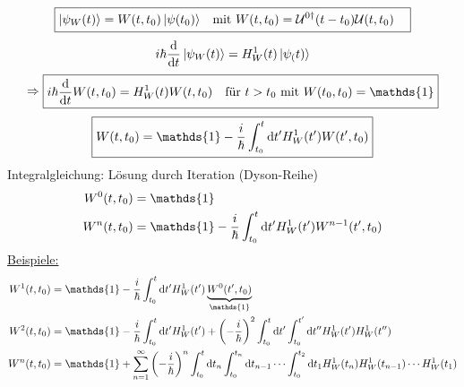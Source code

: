 		\begin{align*}
		\boxed{	
		\begin{aligned}
			\ket{\psi_W(t)} &= W(t,t_0) \ket{\psi(t_0)} &\text{mit~} W(t,t_0) &= \mathcal{U}^{0\dagger} (t-t_0) \mathcal{U} (t,t_0) 
		\end{aligned}
		}
		\end{align*}
		\begin{equation*}
			i \hbar \frac{\mathrm{d}}{\mathrm{d} t} \ket{\psi_W(t)} = H^1_W(t) \ket{\psi_(t)}
		\end{equation*}	
		\begin{align*}
		\Rightarrow
		\boxed{	
			\begin{aligned}
				i \hbar \frac{\diff}{\diff t} W(t,t_0) 
				&= H^1_W(t) W(t,t_0) &\text{für~} t>t_0 \text{~mit~} W(t_0,t_0) = \mathds{1}
			\end{aligned}
		}
		\end{align*}
		\begin{equation*}
			\boxed{ W(t,t_0) = \mathds{1} 
				- \frac{i}{\hbar} \int_{t_0}^{t} \diff t' H^1_W(t') W(t',t_0)
				}
		\end{equation*}
	Integralgleichung: Lösung durch Iteration (Dyson-Reihe)
		\begin{align*}
			W^0(t,t_0) &= \mathds{1} \\
			W^n(t,t_0) &= \mathds{1} - \frac{i}{\hbar} \int_{t_0}^{t} \diff t' H^1_W(t') W^{n-1}(t',t_0)
		\end{align*}
	\underline{Beispiele:}
		\begin{align*}
			W^1(t,t_0) &= \mathds{1}
			- \frac{i}{\hbar} \int_{t_0}^{t} \diff t' H^1_W(t') \underbrace{W^{0}(t',t_0)}_{\substack{\mathds{1}}} \\
			W^2(t,t_0) &= \mathds{1} 
			- \frac{i}{\hbar} \int_{t_0}^{t} \diff t' H^1_W(t')
			+ \left( -\frac{i}{\hbar}\right)^2 \int_{t_0}^{t} \diff t' \int_{t_0}^{t'} \diff t'' H^1_W(t') H^1_W(t'') \\
			W^n(t,t_0) &= \mathds{1} 
			+ \sum_{n=1}^{\infty} \left(-\frac{i}{\hbar}\right)^n 
			\int_{t_0}^{t} \diff t_n
			\int_{t_0}^{t_n} \diff t_{n-1} \cdots 
			\int_{t_0}^{t_2} \diff t_1 H^1_W(t_n) H^1_W(t_{n-1}) \cdots H^1_W(t_1)
		\end{align*}